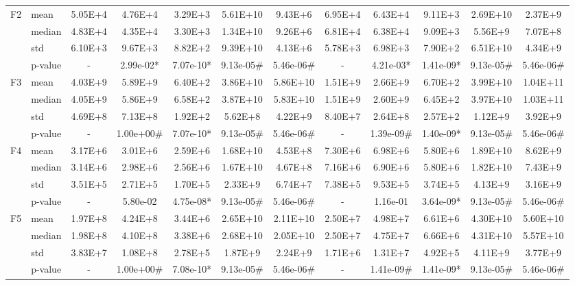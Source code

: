 \documentclass[conference]{IEEEtran}
\begin{document}
\begin{table}[htbp]
{\begin{tabular}{llccccc|ccccc}
\midrule
\multirow{4}{*}{F2}
& mean    & 5.05E+4 & 4.76E+4 & 3.29E+3 & 5.61E+10 & 9.43E+6 & 6.95E+4 & 6.43E+4 & 9.11E+3 & 2.69E+10 & 2.37E+9 \\
& median  & 4.83E+4 & 4.35E+4 & 3.30E+3 & 1.34E+10 & 9.26E+6 & 6.81E+4 & 6.38E+4 & 9.09E+3 & 5.56E+9 & 7.07E+8 \\
& std     & 6.10E+3 & 9.67E+3 & 8.82E+2 & 9.39E+10 & 4.13E+6 & 5.78E+3 & 6.98E+3 & 7.90E+2 & 6.51E+10 & 4.34E+9 \\
& p-value & - & 2.99e-02* & 7.07e-10* & 9.13e-05\# & 5.46e-06\# & - & 4.21e-03* & 1.41e-09* & 9.13e-05\# & 5.46e-06\# \\
\midrule
\multirow{4}{*}{F3}
& mean    & 4.03E+9 & 5.89E+9 & 6.40E+2 & 3.86E+10 & 5.86E+10 & 1.51E+9 & 2.66E+9 & 6.70E+2 & 3.99E+10 & 1.04E+11 \\
& median  & 4.05E+9 & 5.86E+9 & 6.58E+2 & 3.87E+10 & 5.83E+10 & 1.51E+9 & 2.60E+9 & 6.45E+2 & 3.97E+10 & 1.03E+11 \\
& std     & 4.69E+8 & 7.13E+8 & 1.92E+2 & 5.62E+8 & 4.22E+9 & 8.40E+7 & 2.64E+8 & 2.57E+2 & 1.12E+9 & 3.92E+9 \\
& p-value & - & 1.00e+00\# & 7.07e-10* & 9.13e-05\# & 5.46e-06\# & - & 1.39e-09\# & 1.40e-09* & 9.13e-05\# & 5.46e-06\# \\
\midrule
\multirow{4}{*}{F4}
& mean    & 3.17E+6 & 3.01E+6 & 2.59E+6 & 1.68E+10 & 4.53E+8 & 7.30E+6 & 6.98E+6 & 5.80E+6 & 1.89E+10 & 8.62E+9 \\
& median  & 3.14E+6 & 2.98E+6 & 2.56E+6 & 1.67E+10 & 4.67E+8 & 7.16E+6 & 6.90E+6 & 5.80E+6 & 1.82E+10 & 7.43E+9 \\
& std     & 3.51E+5 & 2.71E+5 & 1.70E+5 & 2.33E+9 & 6.74E+7 & 7.38E+5 & 9.53E+5 & 3.74E+5 & 4.13E+9 & 3.16E+9 \\
& p-value & - & 5.80e-02 & 4.75e-08* & 9.13e-05\# & 5.46e-06\# & - & 1.16e-01 & 3.64e-09* & 9.13e-05\# & 5.46e-06\# \\
\midrule
\multirow{4}{*}{F5}
& mean    & 1.97E+8 & 4.24E+8 & 3.44E+6 & 2.65E+10 & 2.11E+10 & 2.50E+7 & 4.98E+7 & 6.61E+6 & 4.30E+10 & 5.60E+10 \\
& median  & 1.98E+8 & 4.10E+8 & 3.38E+6 & 2.68E+10 & 2.05E+10 & 2.50E+7 & 4.75E+7 & 6.66E+6 & 4.31E+10 & 5.57E+10 \\
& std     & 3.83E+7 & 1.08E+8 & 2.78E+5 & 1.87E+9 & 2.24E+9 & 1.71E+6 & 1.31E+7 & 4.92E+5 & 4.11E+9 & 3.77E+9 \\
& p-value & - & 1.00e+00\# & 7.08e-10* & 9.13e-05\# & 5.46e-06\# & - & 1.41e-09\# & 1.41e-09* & 9.13e-05\# & 5.46e-06\# \\

\end{tabular}}
\end{table}
\end{document}
